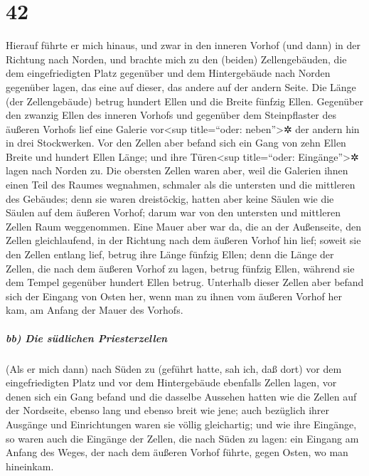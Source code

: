 \hypertarget{section-41}{%
\section{42}\label{section-41}}

Hierauf führte er mich hinaus, und zwar in den inneren
Vorhof (und dann) in der Richtung nach Norden, und brachte mich zu den
(beiden) Zellengebäuden, die dem eingefriedigten Platz gegenüber und dem
Hintergebäude nach Norden gegenüber lagen, das eine auf dieser,
das andere auf der andern Seite. Die Länge (der
Zellengebäude) betrug hundert Ellen und die Breite fünfzig Ellen.
Gegenüber den zwanzig Ellen des inneren Vorhofs und
gegenüber dem Steinpflaster des äußeren Vorhofs lief eine Galerie
vor\textless sup title=``oder: neben''\textgreater✲ der andern hin in
drei Stockwerken. Vor den Zellen aber befand sich ein Gang
von zehn Ellen Breite und hundert Ellen Länge; und ihre
Türen\textless sup title=``oder: Eingänge''\textgreater✲ lagen nach
Norden zu. Die obersten Zellen waren aber, weil die
Galerien ihnen einen Teil des Raumes wegnahmen, schmaler als die
untersten und die mittleren des Gebäudes; denn sie waren
dreistöckig, hatten aber keine Säulen wie die Säulen auf dem äußeren
Vorhof; darum war von den untersten und mittleren Zellen Raum
weggenommen. Eine Mauer aber war da, die an der
Außenseite, den Zellen gleichlaufend, in der Richtung nach dem äußeren
Vorhof hin lief; soweit sie den Zellen entlang lief, betrug ihre Länge
fünfzig Ellen; denn die Länge der Zellen, die nach dem
äußeren Vorhof zu lagen, betrug fünfzig Ellen, während sie dem Tempel
gegenüber hundert Ellen betrug. Unterhalb dieser Zellen
aber befand sich der Eingang von Osten her, wenn man zu ihnen vom
äußeren Vorhof her kam, am Anfang der Mauer des Vorhofs.

\hypertarget{bb-die-suxfcdlichen-priesterzellen}{%
\subparagraph{bb) Die südlichen
Priesterzellen}\label{bb-die-suxfcdlichen-priesterzellen}}

(Als er mich dann) nach Süden zu (geführt hatte, sah ich, daß dort) vor
dem eingefriedigten Platz und vor dem Hintergebäude ebenfalls Zellen
lagen, vor denen sich ein Gang befand und die dasselbe
Aussehen hatten wie die Zellen auf der Nordseite, ebenso lang und ebenso
breit wie jene; auch bezüglich ihrer Ausgänge und Einrichtungen waren
sie völlig gleichartig; und wie ihre Eingänge, so waren
auch die Eingänge der Zellen, die nach Süden zu lagen: ein Eingang am
Anfang des Weges, der nach dem äußeren Vorhof führte, gegen Osten, wo
man hineinkam.

